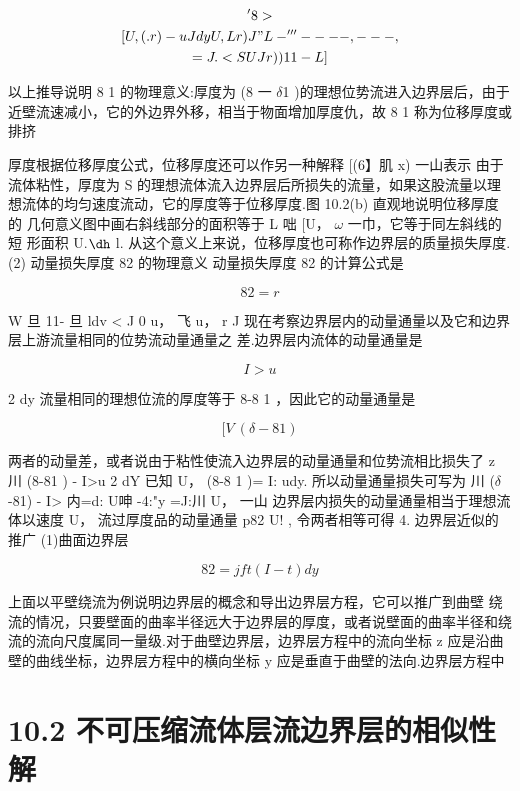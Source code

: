 \begin{gather*}
'8>\\
[U,(.r) - uJdy U, Lr)J " L- '''-- --,---,\\
=J.<SUJr)) 11-L]
\end{gather*}

以上推导说明 8 1 的物理意义:厚度为 (8 一 $\delta$1 )的理想位势流进入边界层后，由于 近壁流速减小，它的外边界外移，相当于物面增加厚度仇，故 8 1 称为位移厚度或排挤

厚度根据位移厚度公式，位移厚度还可以作另一种解释 [(6】肌 x) 一山表示 由于流体粘性，厚度为 S 的理想流体流入边界层后所损失的流量，如果这股流量以理 想流体的均匀速度流动，它的厚度等于位移厚度.图 10.2(b) 直观地说明位移厚度的 几何意义图中画右斜线部分的面积等于 L 咄 [U， $\omega$ 一巾，它等于同左斜线的短 形面积 U.${\rm ð}$ l. 从这个意义上来说，位移厚度也可称作边界层的质量损失厚度. (2) 动量损失厚度 82 的物理意义 动量损失厚度 82 的计算公式是

\[82 = r\]

W 旦 11- 旦 ldv < J 0 u， 飞 u， r J 现在考察边界层内的动量通量以及它和边界层上游流量相同的位势流动量通量之 差.边界层内流体的动量通量是

\[I>u\]

2 dy 流量相同的理想位流的厚度等于 8-8 1 ，因此它的动量通量是

\[[V~( \delta -81 )\]

两者的动量差，或者说由于粘性使流入边界层的动量通量和位势流相比损失了 z 川 (8-81 ) - I>u 2 dY 已知 U， (8-8 1 )= I: udy. 所以动量通量损失可写为 川 ($\delta$-81) - I> 内=d: U呻 -4:"y =J:川 U， 一山 边界层内损失的动量通量相当于理想流体以速度 U， 流过厚度品的动量通量 p82 U! , 令两者相等可得 4. 边界层近似的推广 (1)曲面边界层

\[82=jf t(I-t)dy\]

上面以平壁绕流为例说明边界层的概念和导出边界层方程，它可以推广到曲壁 绕流的情况，只要壁面的曲率半径远大于边界层的厚度，或者说壁面的曲率半径和绕 流的流向尺度属同一量级.对于曲壁边界层，边界层方程中的流向坐标 z 应是沿曲 壁的曲线坐标，边界层方程中的横向坐标 y 应是垂直于曲壁的法向.边界层方程中

\section*{10.2  不可压缩流体层流边界层的相似性解}

